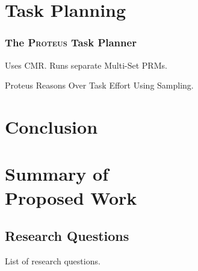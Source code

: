 \documentclass{report}
\begin{document}
\newpage
\chapter{Task Planning}
\label{chap:task-planning}

\subsection{The \textsc{Proteus} Task Planner}

Uses CMR.
Runs separate Multi-Set PRMs.

Proteus Reasons Over Task Effort Using Sampling.


\newpage
\chapter{Conclusion}


\newpage
\chapter[Summary of Proposed Work]{Summary of\\Proposed Work}

\section{Research Questions}
\label{sec:research-questions}

List of research questions.
\end{document}

